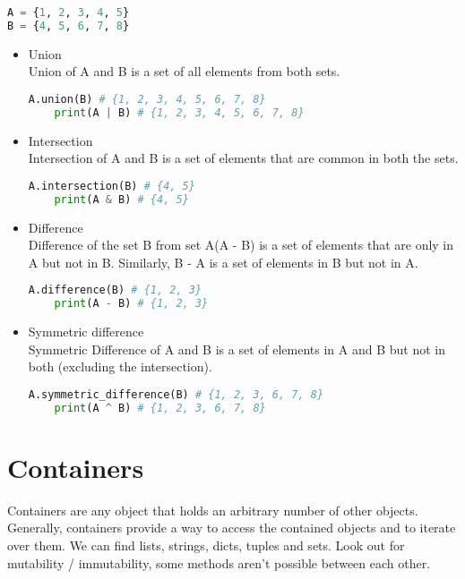 \documentclass[a4paper, 12pt, titlepage]{scrartcl} %
\begin{document}
\begin{lstlisting}[language=Python]
A = {1, 2, 3, 4, 5}
B = {4, 5, 6, 7, 8}
\end{lstlisting} \vspace{5mm}
\begin{itemize}
    \item Union \\
    Union of A and B is a set of all elements from both sets.
    \begin{lstlisting}[language=Python]
    A.union(B) # {1, 2, 3, 4, 5, 6, 7, 8}
    print(A | B) # {1, 2, 3, 4, 5, 6, 7, 8}\end{lstlisting} \vspace{5mm}
    
    \item Intersection \\
    Intersection of A and B is a set of elements that are common in both the sets.
    \begin{lstlisting}[language=Python]
    A.intersection(B) # {4, 5}
    print(A & B) # {4, 5}\end{lstlisting} \vspace{5mm}
    
    \item Difference \\
    Difference of the set B from set A(A - B) is a set of elements that are only in A but not in B. Similarly, B - A is a set of elements in B but not in A.
    \begin{lstlisting}[language=Python]
    A.difference(B) # {1, 2, 3}
    print(A - B) # {1, 2, 3}\end{lstlisting} \vspace{5mm}
    
    \item Symmetric difference \\
    Symmetric Difference of A and B is a set of elements in A and B but not in both (excluding the intersection).
    \begin{lstlisting}[language=Python]
    A.symmetric_difference(B) # {1, 2, 3, 6, 7, 8}
    print(A ^ B) # {1, 2, 3, 6, 7, 8}\end{lstlisting} \vspace{5mm}
    
\end{itemize}

\section{Containers}
Containers are any object that holds an arbitrary number of other objects. Generally, containers provide a way to access the contained objects and to iterate over them. We can find lists, strings, dicts, tuples and sets. Look out for mutability / immutability, some methods aren't possible between each other. 
\end{document}
